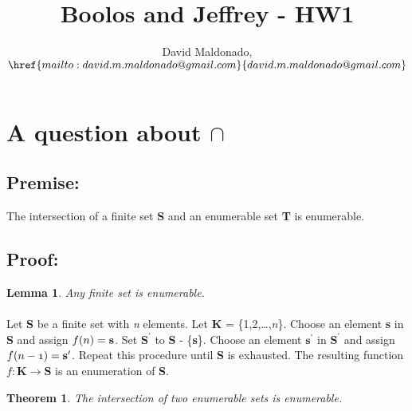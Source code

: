\documentclass[a4paper,11pt]{article}
\author{David Maldonado, $\href{mailto:david.m.maldonado@gmail.com}%
{david.m.maldonado@gmail.com}$}
\title{Boolos and Jeffrey - HW1}
\newtheorem{lem}{Lemma}[section]
\newtheorem{thm}{Theorem}[section]
\begin{document}
\maketitle


\section{A question about $\cap$} 

	\subsection*{Premise:}
	The intersection of a finite set \textbf{S} and an enumerable set \textbf{T} is enumerable.

	\subsection*{Proof:}

	\begin{lem}Any finite set is enumerable.\end{lem}
		\paragraph{}
		Let \textbf{S} be a finite set with \textit{n} elements. Let \textbf{K} = \{1,2,\dots,\textit{n}\}. 
		Choose an element \textbf{s} in \textbf{S} and assign $\mathnormal{f(n)} = \textbf{s}$. 
		Set $\textbf{S}^\prime$ to \textbf{S} - \{\textbf{s}\}. Choose an element $\textbf{s}^\prime$ 
		in $\textbf{S}^\prime$ and assign $\mathnormal{f(n-1)} = \textbf{s}^\prime$. 
		Repeat this procedure until \textbf{S} is exhausted. The resulting function $f : \textbf{K} \rightarrow 			\textbf{S}$ is an enumeration of \textbf{S}.
		\bigskip
		
	\begin{thm}The intersection of two enumerable sets is enumerable.\end{thm}
\end{document}
